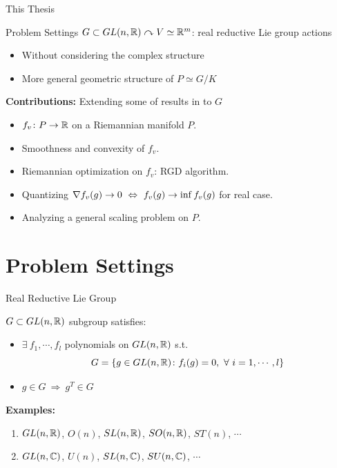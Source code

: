 \documentclass{beamer}
\begin{document}
	\begin{frame}{This Thesis}
		\begin{block}{Problem Settings}
			$G \subset GL(n,\mathbb{R})  \curvearrowright V \simeq \mathbb{R}^m$: real reductive Lie group actions
			\begin{itemize}
				\item Without considering the complex structure
				\item More general geometric structure of $P \simeq G/K$
			\end{itemize}
		\end{block}
		\vspace{1em}
		\textbf{Contributions:} Extending some of results in \cite{key8} to $G$
		\begin{itemize}
			\item $f_v \colon P \rightarrow \mathbb{R}$ on a Riemannian manifold $P$.
			\item Smoothness and convexity of $f_v$.
			\item Riemannian optimization on $f_v$: RGD algorithm.
			\item Quantizing $\nabla f_v(g) \rightarrow 0 ~\Leftrightarrow~ f_v(g) \rightarrow \inf f_v(g)$ for real case.
			\item Analyzing a general scaling problem on $P$.
		\end{itemize}
	\end{frame}

	\section{Problem Settings}
	\begin{frame}{Real Reductive Lie Group}
		\begin{defn}
			$G\subset GL(n,\mathbb{R})$ subgroup satisfies:
			\begin{itemize}
				\item $\exists~ f_1,\cdots,f_l$ polynomials on $GL(n,\mathbb{R})$ s.t.
					\vspace{-0.5em}
					\begin{equation*}
						G = \bb{g \in GL(n,\R) \colon f_i(g) = 0,~\forall~i=1,\cdots,l}
						\vspace{-0.5em}
					\end{equation*}
				\item $g \in G~\Rightarrow~g^T \in G$
			\end{itemize}
		\end{defn}
		\textbf{Examples:} 
		\begin{enumerate}
			\item $GL(n,\mathbb{R})$, $O(n)$, $SL(n,\mathbb{R})$, $SO(n,\mathbb{R})$, $ST(n)$, $\cdots$
			\item $GL(n,\mathbb{C})$, $U(n)$, $SL(n,\mathbb{C})$, $SU(n,\mathbb{C})$, $\cdots$
		\end{enumerate}
	\end{frame}
\end{document}
